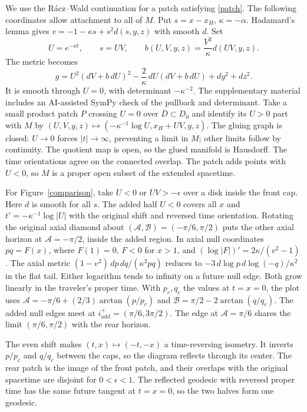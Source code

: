 \documentclass[12pt]{article}
\begin{document}
We use the R\'acz--Wald continuation \cite{RaczWald1992} for a patch
satisfying \eqref{patch}. The following coordinates allow attachment to
all of \(M\).
Put \(s=x-x_H\), \(\kappa=-\alpha\).
Hadamard's lemma gives \(v=-1-\kappa s+s^2d(s,y,z)\) with smooth \(d\).
Set
\begin{equation}
 U=e^{-\kappa t},\qquad s=UV,\qquad
 b(U,V,y,z)=\frac{V^2}{\kappa}d(UV,y,z).
\end{equation}
The metric becomes
\begin{equation}
 g=U^2(dV+b\,dU)^2-\frac{2}{\kappa}\,dU(dV+b\,dU)+dy^2+dz^2 .
 \label{extended}
\end{equation}
It is smooth through \(U=0\), with determinant \(-\kappa^{-2}\).
The supplementary material includes an AI-assisted SymPy check of the
pullback and determinant.
Take a small product patch \(P\) crossing \(U=0\) over
\(\overline D\subset D_0\) and identify its \(U>0\) part with \(M\) by
\((U,V,y,z)\mapsto(-\kappa^{-1}\log U,x_H+UV,y,z)\).
The gluing graph is closed: \(U\to0\) forces \(|t|\to\infty\), preventing a
limit in \(M\); other limits follow by continuity. The quotient map is open,
so the glued manifold is Hausdorff. The time orientations agree on the
connected overlap. The patch adds points with \(U<0\), so \(M\) is a
proper open subset of the extended spacetime.

For Figure~\ref{comparison}, take \(U<0\) or \(UV>-\epsilon\) over a disk
inside the front cap. Here \(d\) is smooth for all \(s\). The added half
\(U<0\) covers all \(x\) and \(t'=-\kappa^{-1}\log|U|\) with the original
shift and reversed time orientation. Rotating the original axial diamond
about \((\mathcal A,\mathcal B)=(-\pi/6,\pi/2)\) puts the other axial horizon
at \(\mathcal A=-\pi/2\), inside the added region.
In axial null coordinates \(pq=F(x)\), where \(F(1)=0\), \(F<0\) for \(x>1\),
and \((\log|F|)'=2\kappa/(v^2-1)\). The axial metric
\((1-v^2)\,dp\,dq/(\kappa^2pq)\) reduces to
\(-3\,d\log p\,d\log(-q)/\kappa^2\) in the flat tail. Either logarithm tends
to infinity on a future null edge. Both grow linearly in the traveler's
proper time. With \(p_c,q_c\) the values at \(t=x=0\), the plot uses
\(\mathcal A=-\pi/6+(2/3)\arctan(p/p_c)\) and \(\mathcal B=\pi/2-2\arctan(q/q_c)\).
The added null edges meet at \(i^+_{\mathrm{add}}=(\pi/6,3\pi/2)\). The edge at
\(\mathcal A=\pi/6\) shares the limit \((\pi/6,\pi/2)\) with the rear horizon.

The even shift makes \((t,x)\mapsto(-t,-x)\) a time-reversing isometry. It
inverts \(p/p_c\) and \(q/q_c\) between the caps, so the diagram reflects
through its center. The rear patch is the image of the front patch, and
their overlaps with the original spacetime are disjoint for \(0<\epsilon<1\).
The reflected geodesic with reversed proper time has the same future
tangent at \(t=x=0\), so the two halves form one geodesic.
\end{document}
